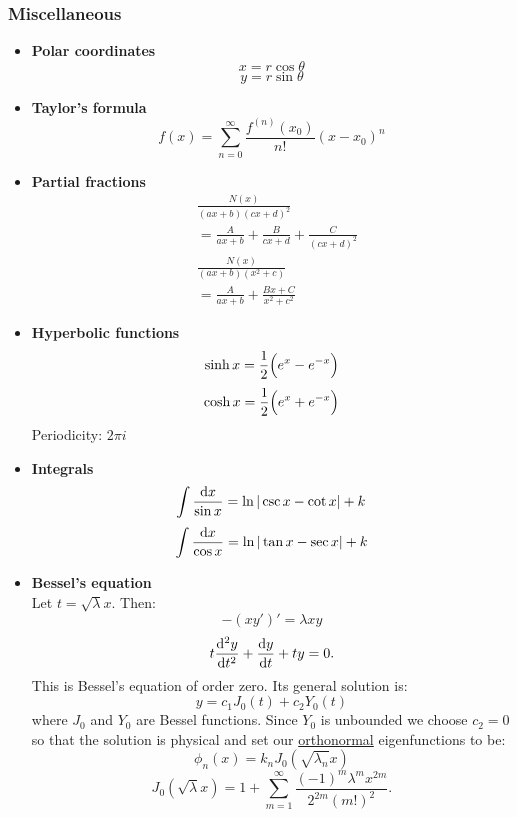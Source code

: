 \documentclass{article}
\begin{document}
\begin{multicols*}{3}
    \subsubsection*{Miscellaneous}
    \begin{itemize}
        \item \textbf{Polar coordinates}
        $$x=r\cos\theta$$
        $$y=r\sin\theta$$

        \item \textbf{Taylor's formula}
        $$f(x)=\sum_{n=0}^{\infty}
        \frac{f^{(n)}(x_0)}{n!}
        (x-x_0)^n$$

        \item \textbf{Partial fractions}
        \begin{align*}
            &\frac{N(x)}{(ax+b)(cx+d)^2} \\
            &=\frac{A}{ax+b}
            +\frac{B}{cx+d}
            +\frac{C}{(cx+d)^2} \\[0.3em]
            &\frac{N(x)}{(ax+b)(x^2+c)} \\
            &=\frac{A}{ax+b}
            +\frac{Bx+C}{x^2+c^2}
        \end{align*}

        \item \textbf{Hyperbolic functions}
        $$\sinh x=\frac{1}{2}\Bigl(e^x-e^{-x}\Bigr)$$
        $$\cosh x=\frac{1}{2}\Bigl(e^x+e^{-x}\Bigr)$$
        Periodicity: $2\pi i$

        \item \textbf{Integrals}
        $$\int\frac{\dd x}{\sin x}
        =\ln|\cosecant x-\cotangent x|+k$$
        $$\int\frac{\dd x}{\cos x}
        =\ln|\tan x-\secant x|+k$$

        \columnbreak

        \item \textbf{Bessel's equation} \\
        Let $t=\sqrt{\lambda}x$.
        Then:
        $$-(xy')'=\lambda xy$$
        $$t\dv[2]{y}{t}+\dv{y}{t}+ty=0.$$
        This is Bessel's equation of order zero.
        Its general solution is:
        $$y=c_1 J_0(t)+c_2 Y_0(t)$$
        where $J_0$ and $Y_0$ are Bessel functions.
        Since $Y_0$ is unbounded we choose $c_2=0$
        so that the solution is physical
        and set our \underline{orthonormal}
        eigenfunctions to be:
        $$\phi_n(x)=k_n J_0(\sqrt{\lambda_n}x)$$
        $$
            J_0(\sqrt{\lambda}x)=1
            +\sum_{m=1}^{\infty}
            \frac{(-1)^m\lambda^m x^{2m}}
            {2^{2m}(m!)^2}.
        $$


\end{itemize}
\end{multicols*}
\end{document}
